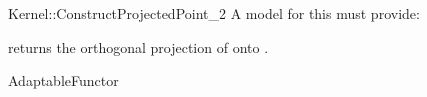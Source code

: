\begin{ccRefFunctionObjectConcept}{Kernel::ConstructProjectedPoint_2}
A model for this must provide:


       {returns the orthogonal projection of  onto .}

\ccRefines
AdaptableFunctor

\ccSeeAlso
{} \\

\end{ccRefFunctionObjectConcept}
